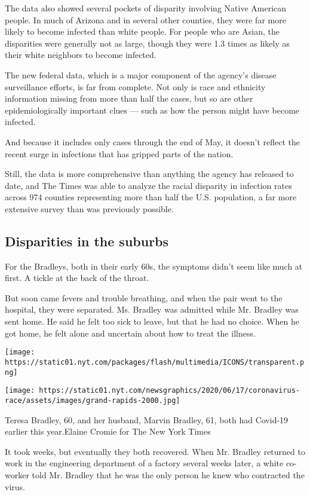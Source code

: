 The data also showed several pockets of disparity involving Native
American people. In much of Arizona and in several other counties, they
were far more likely to become infected than white people. For people
who are Asian, the disparities were generally not as large, though they
were 1.3 times as likely as their white neighbors to become infected.

The new federal data, which is a major component of the agency's disease
surveillance efforts, is far from complete. Not only is race and
ethnicity information missing from more than half the cases, but so are
other epidemiologically important clues --- such as how the person might
have become infected.

And because it includes only cases through the end of May, it doesn't
reflect the recent surge in infections that has gripped parts of the
nation.

Still, the data is more comprehensive than anything the agency has
released to date, and The Times was able to analyze the racial disparity
in infection rates across 974 counties representing more than half the
U.S. population, a far more extensive survey than was previously
possible.

\hypertarget{disparities-in-the-suburbs}{%
\subsection{Disparities in the
suburbs}\label{disparities-in-the-suburbs}}

For the Bradleys, both in their early 60s, the symptoms didn't seem like
much at first. A tickle at the back of the throat.

But soon came fevers and trouble breathing, and when the pair went to
the hospital, they were separated. Ms. Bradley was admitted while Mr.
Bradley was sent home. He said he felt too sick to leave, but that he
had no choice. When he got home, he felt alone and uncertain about how
to treat the illness.

\texttt{[image: https://static01.nyt.com/packages/flash/multimedia/ICONS/transparent.png]}

\texttt{[image: https://static01.nyt.com/newsgraphics/2020/06/17/coronavirus-race/assets/images/grand-rapids-2000.jpg]}

Teresa Bradley, 60, and her husband, Marvin Bradley, 61, both had
Covid-19 earlier this year.Elaine Cromie for The New York Times

It took weeks, but eventually they both recovered. When Mr. Bradley
returned to work in the engineering department of a factory several
weeks later, a white co-worker told Mr. Bradley that he was the only
person he knew who contracted the virus.

